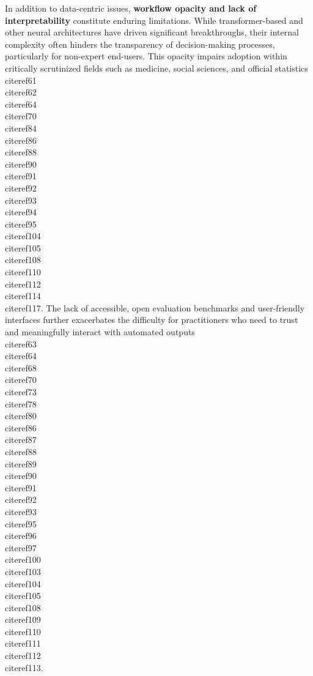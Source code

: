\documentclass[11pt]{article}
\begin{document}
In addition to data-centric issues, \textbf{workflow opacity and lack of interpretability} constitute enduring limitations. While transformer-based and other neural architectures have driven significant breakthroughs, their internal complexity often hinders the transparency of decision-making processes, particularly for non-expert end-users. This opacity impairs adoption within critically scrutinized fields such as medicine, social sciences, and official statistics \\cite{ref61}\\cite{ref62}\\cite{ref64}\\cite{ref70}\\cite{ref84}\\cite{ref86}\\cite{ref88}\\cite{ref90}\\cite{ref91}\\cite{ref92}\\cite{ref93}\\cite{ref94}\\cite{ref95}\\cite{ref104}\\cite{ref105}\\cite{ref108}\\cite{ref110}\\cite{ref112}\\cite{ref114}\\cite{ref117}. The lack of accessible, open evaluation benchmarks and user-friendly interfaces further exacerbates the difficulty for practitioners who need to trust and meaningfully interact with automated outputs \\cite{ref63}\\cite{ref64}\\cite{ref68}\\cite{ref70}\\cite{ref73}\\cite{ref78}\\cite{ref80}\\cite{ref86}\\cite{ref87}\\cite{ref88}\\cite{ref89}\\cite{ref90}\\cite{ref91}\\cite{ref92}\\cite{ref93}\\cite{ref95}\\cite{ref96}\\cite{ref97}\\cite{ref100}\\cite{ref103}\\cite{ref104}\\cite{ref105}\\cite{ref108}\\cite{ref109}\\cite{ref110}\\cite{ref111}\\cite{ref112}\\cite{ref113}.
\end{document}
